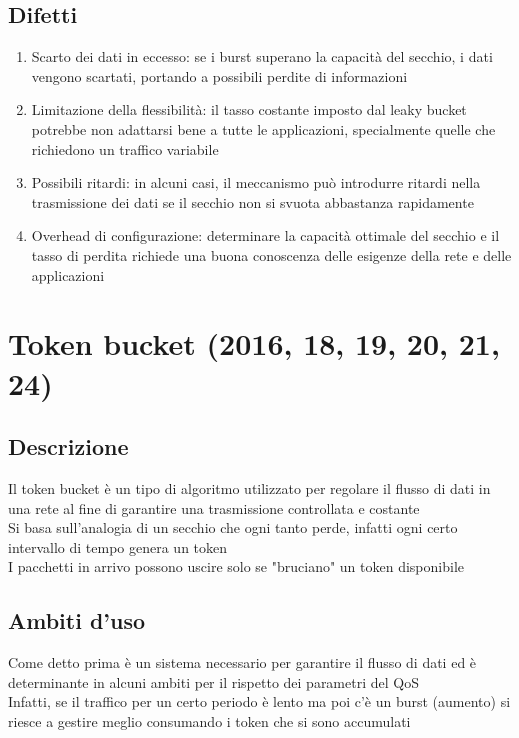 \documentclass[10pt,oneside,a4paper]{article}
\begin{document}
\subsection{Difetti}
\begin{enumerate}
    \item Scarto dei dati in eccesso: se i burst superano la capacità del secchio, i dati vengono scartati, portando a possibili perdite di informazioni
    \item Limitazione della flessibilità: il tasso costante imposto dal leaky bucket potrebbe non adattarsi bene a tutte le applicazioni, specialmente quelle che richiedono un traffico variabile
    \item Possibili ritardi: in alcuni casi, il meccanismo può introdurre ritardi nella trasmissione dei dati se il secchio non si svuota abbastanza rapidamente
    \item Overhead di configurazione: determinare la capacità ottimale del secchio e il tasso di perdita richiede una buona conoscenza delle esigenze della rete e delle applicazioni
\end{enumerate}
\section{Token bucket (2016, 18, 19, 20, 21, 24)}
\subsection{Descrizione}
Il token bucket è un tipo di algoritmo utilizzato per regolare il flusso di dati in una rete al fine di garantire una trasmissione controllata e costante\\
Si basa sull'analogia di un secchio che ogni tanto perde, infatti ogni certo intervallo di tempo genera un token\\
I pacchetti in arrivo possono uscire solo se "bruciano" un token disponibile
\subsection{Ambiti d'uso}
Come detto prima è un sistema necessario per garantire il flusso di dati ed è determinante in alcuni ambiti per il rispetto dei parametri del QoS\\
Infatti, se il traffico per un certo periodo è lento ma poi c'è un burst (aumento) si riesce a gestire meglio consumando i token che si sono accumulati
\end{document}
